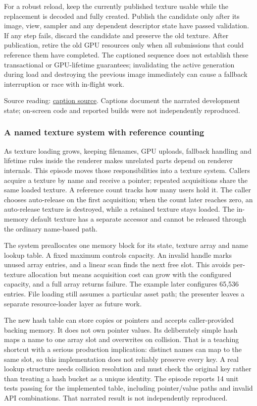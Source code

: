 For a robust reload, keep the currently published texture usable while the replacement is decoded and fully created. Publish the candidate only after its image, view, sampler and any dependent descriptor state have passed validation. If any step fails, discard the candidate and preserve the old texture. After publication, retire the old GPU resources only when all submissions that could reference them have completed. The captioned sequence does not establish these transactional or GPU-lifetime guarantees; invalidating the active generation during load and destroying the previous image immediately can cause a fallback interruption or race with in-flight work.

Source reading: \href{https://www.youtube.com/watch?v=2IxHj52-Kag}{caption source}. Captions document the narrated development state; on-screen code and reported builds were not independently reproduced.

\subsubsection{A named texture system with reference counting}\label{06-engine-ii-ch027-a-named-texture-system-with-reference-counting}

As texture loading grows, keeping filenames, GPU uploads, fallback handling and lifetime rules inside the renderer makes unrelated parts depend on renderer internals. This episode moves those responsibilities into a texture system. Callers acquire a texture by name and receive a pointer; repeated acquisitions share the same loaded texture. A reference count tracks how many users hold it. The caller chooses auto-release on the first acquisition; when the count later reaches zero, an auto-release texture is destroyed, while a retained texture stays loaded. The in-memory default texture has a separate accessor and cannot be released through the ordinary name-based path.

The system preallocates one memory block for its state, texture array and name lookup table. A fixed maximum controls capacity. An invalid handle marks unused array entries, and a linear scan finds the next free slot. This avoids per-texture allocation but means acquisition cost can grow with the configured capacity, and a full array returns failure. The example later configures 65,536 entries. File loading still assumes a particular asset path; the presenter leaves a separate resource-loader layer as future work.

The new hash table can store copies or pointers and accepts caller-provided backing memory. It does not own pointer values. Its deliberately simple hash maps a name to one array slot and overwrites on collision. That is a teaching shortcut with a serious production implication: distinct names can map to the same slot, so this implementation does not reliably preserve every key. A real lookup structure needs collision resolution and must check the original key rather than treating a hash bucket as a unique identity. The episode reports 14 unit tests passing for the implemented table, including pointer/value paths and invalid API combinations. That narrated result is not independently reproduced.


